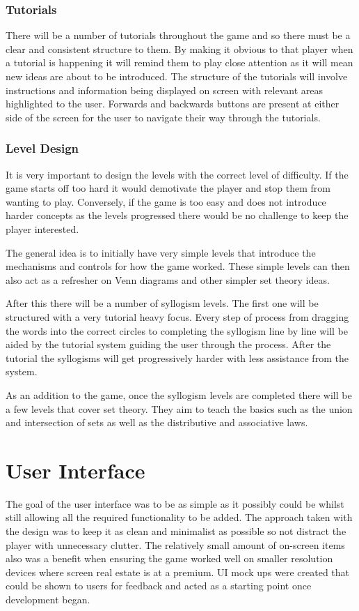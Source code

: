 \documentclass[12pt,a4paper]{report}
\begin{document}
\subsubsection{Tutorials}
There will be a number of tutorials throughout the game and so there must be a clear and consistent structure to them. By making it obvious to that player when a tutorial is happening it will remind them to play close attention as it will mean new ideas are about to be introduced. The structure of the tutorials will involve instructions and information being displayed on screen with relevant areas highlighted to the user. Forwards and backwards buttons are present at either side of the screen for the user to navigate their way through the tutorials. 

\subsubsection{Level Design}
It is very important to design the levels with the correct level of difficulty. If the game starts off too hard it would demotivate the player and stop them from wanting to play. Conversely, if the game is too easy and does not introduce harder concepts as the levels progressed there would be no challenge to keep the player interested.

The general idea is to initially have very simple levels that introduce the mechanisms and controls for how the game worked. These simple levels can then also act as a refresher on Venn diagrams and other simpler set theory ideas.

After this there will be a number of syllogism levels. The first one will be structured with a very tutorial heavy focus. Every step of process from dragging the words into the correct circles to completing the syllogism line by line will be aided by the tutorial system guiding the user through the process. After the tutorial the syllogisms will get progressively harder with less assistance from the system.

As an addition to the game, once the syllogism levels are completed there will be a few levels that cover set theory. They aim to teach the basics such as the union and intersection of sets as well as the distributive and associative laws. 

\section{User Interface}
The goal of the user interface was to be as simple as it possibly could be whilst still allowing all the required functionality to be added. The approach taken with the design was to keep it as clean and minimalist as possible so not distract the player with unnecessary clutter. The relatively small amount of on-screen items also was a benefit when ensuring the game worked well on smaller resolution devices where screen real estate is at a premium. UI mock ups were created that could be shown to users for feedback and acted as a starting point once development began.
\end{document}
